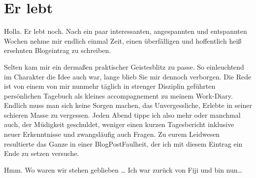 \chapter{Er lebt}

Holla. Er lebt noch. Nach ein paar interessanten, angespannten und
entspannten Wochen nehme mir endlich einmal Zeit, einen überfälligen und
hoffentlich heiß ersehnten Blogeintrag zu schreiben.

Selten kam mir ein dermaßen praktischer Geistesblitz zu passe. So
einleuchtend im Charakter die Idee auch war, lange blieb Sie mir dennoch
verborgen. Die Rede ist von einem von mir nunmehr täglich in strenger
Disziplin geführten persönlichen Tagebuch als kleines accompagnement zu
meinem Work-Diary. Endlich muss man sich keine Sorgen machen, das
Unvergessliche, Erlebte in seiner schieren Masse zu vergessen. Jeden
Abend tippe ich also mehr oder manchmal auch, der Müdigkeit geschuldet,
weniger einen kurzen Tagesbericht inklusive neuer Erkenntnisse und
zwangsläufig auch Fragen. Zu eurem Leidwesen resultierte das Ganze in
einer BlogPostFaulheit, der ich mit diesem Eintrag ein Ende zu setzen
versuche.

Hmm. Wo waren wir stehen geblieben \ldots{} Ich war zurück von Fiji und
bin nun\ldots{}

